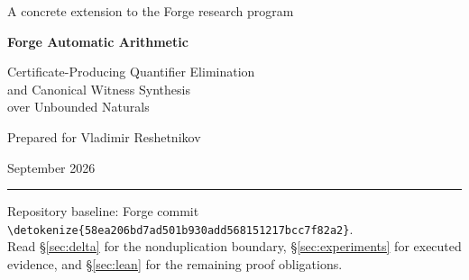 \documentclass[11pt,a4paper]{article}
\theoremstyle{definition}\newtheorem{definition}[theorem]{Definition}
\theoremstyle{remark}\newtheorem{remark}[theorem]{Remark}
\newcommand{\code}[1]{\expandafter\nolinkurl\expandafter{\detokenize{#1}}}
\begin{document}
\begin{titlepage}
\vspace*{12mm}
{\large A concrete extension to the Forge research program\par}
\vspace{11mm}
{\Huge\bfseries Forge Automatic Arithmetic\par}
\vspace{7mm}
{\LARGE Certificate-Producing Quantifier Elimination\\[2mm]and Canonical Witness Synthesis\\[2mm]over Unbounded Naturals\par}
\vspace{12mm}
{\large Prepared for Vladimir Reshetnikov\par}
{\large September 2026\par}
\vspace{12mm}
\begin{abstract}
Forge already proposes an unusually broad collection of proof-producing workers. This article adds a different capability: a compositional decision procedure for first-order formulas over natural numbers with linear arithmetic and selected binary-automatic predicates. Quantifiers range over all natural numbers, not a guessed bit width. The same compiler constructs regular graphs of least witnesses, including the next power of two and the next integer with a prescribed digit-parity relation. Its central engineering object is an exact certificate for existential projection: a locally checkable zero-tail closure combined with a subset-construction receipt. This prevents a subtle but fundamental error in which witnesses longer than their visible inputs disappear.

A standard-library-only Python producer, separately implemented checker, reproducible experiment suite, 90 stored construction certificates, and 643 concrete witness traces accompany the article. The mathematical foundations are classical; the contribution is a focused, executable extension to Forge with explicit semantics and a concrete Lean port plan. Neither the Python checker nor the compiler-to-semantics theorems have been verified in Lean. No new Lean tactic is delivered, and no performance comparison with existing Lean tactics is claimed.
\end{abstract}
\vfill
\rule{\linewidth}{0.5pt}
\small Repository baseline: Forge commit \code{58ea206bd7ad501b930add568151217bcc7f82a2}.\\
Read \S\ref{sec:delta} for the nonduplication boundary, \S\ref{sec:experiments} for executed evidence, and \S\ref{sec:lean} for the remaining proof obligations.
\end{titlepage}
\tableofcontents
\newpage









\clearpage

\end{document}
